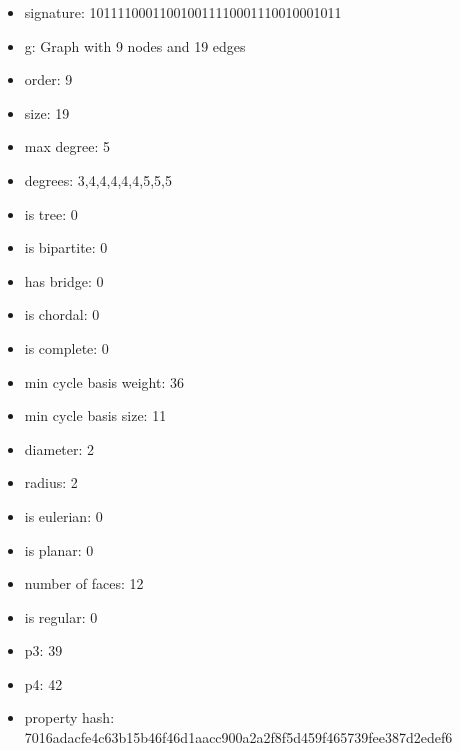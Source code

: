 \newpage
\begin{figure}
\end{figure}
\begin{itemize}
\item signature: 101111000110010011110001110010001011
\item g: Graph with 9 nodes and 19 edges
\item order: 9
\item size: 19
\item max degree: 5
\item degrees: 3,4,4,4,4,4,5,5,5
\item is tree: 0
\item is bipartite: 0
\item has bridge: 0
\item is chordal: 0
\item is complete: 0
\item min cycle basis weight: 36
\item min cycle basis size: 11
\item diameter: 2
\item radius: 2
\item is eulerian: 0
\item is planar: 0
\item number of faces: 12
\item is regular: 0
\item p3: 39
\item p4: 42
\item property hash: 7016adacfe4c63b15b46f46d1aacc900a2a2f8f5d459f465739fee387d2edef6
\end{itemize}

